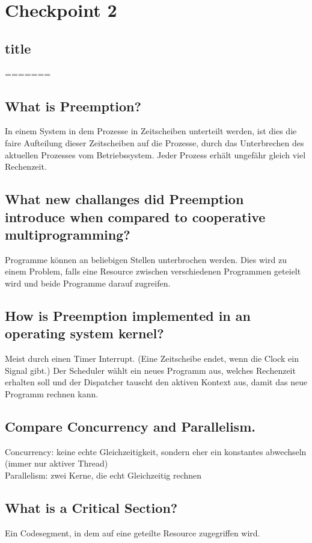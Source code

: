 \section{Checkpoint 2}


\subsection{title}
=======
\addtocounter{subsection}{1}

\subsection{What is Preemption?}
In einem System in dem Prozesse in Zeitscheiben unterteilt werden, ist dies die faire Aufteilung dieser Zeitscheiben auf die Prozesse, durch das Unterbrechen des aktuellen Prozesses vom Betriebssystem.
Jeder Prozess erhält ungefähr gleich viel Rechenzeit.

\subsection{What new challanges did Preemption introduce when compared to cooperative multiprogramming?}
Programme können an beliebigen Stellen unterbrochen werden.
Dies wird zu einem Problem, falls eine Resource zwischen verschiedenen Programmen geteielt wird und beide Programme darauf zugreifen.

\subsection{How is Preemption implemented in an operating system kernel?}
Meist durch einen Timer Interrupt. (Eine Zeitscheibe endet, wenn die Clock ein Signal gibt.)
Der Scheduler wählt ein neues Programm aus, welches Rechenzeit erhalten soll und der Dispatcher tauscht den aktiven Kontext aus, damit das neue Programm rechnen kann.

\subsection{Compare Concurrency and Parallelism.}
Concurrency: keine echte Gleichzeitigkeit, sondern eher ein konstantes abwechseln (immer nur aktiver Thread)\\
Parallelism: zwei Kerne, die echt Gleichzeitig rechnen

\subsection{What is a Critical Section?}
Ein Codesegment, in dem auf eine geteilte Resource zugegriffen wird.


